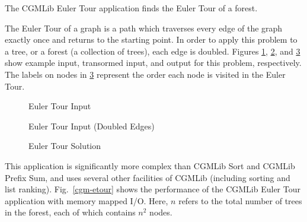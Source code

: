 \documentclass[12pt]{carletoncsthesis}
\begin{document}
The CGMLib Euler Tour application\cite{bsp-etour} finds the Euler Tour of a forest.

The Euler Tour of a graph is a path which traverses every edge of the
graph exactly once and returns to the starting point.  In order to apply
this problem to a tree, or a forest (a collection of trees), each edge is
doubled.  Figures \ref{euler-tree-start-fig}, \ref{euler-tree-doubled-fig},
and \ref{euler-tree-solved-fig} show example input, transormed input, and
output for this problem, respectively.  The labels on nodes in
\ref{euler-tree-solved-fig} represent the order each node is visited in the
Euler Tour.

\begin{figure}[h]
\begin{center}
\end{center}
\caption{Euler Tour Input}
\label{euler-tree-start-fig}
\end{figure}

\begin{figure}[h]
\begin{center}
\end{center}
\caption{Euler Tour Input (Doubled Edges)}
\label{euler-tree-doubled-fig}
\end{figure}

\begin{figure}[h]
\begin{center}
\end{center}
\caption{Euler Tour Solution}
\label{euler-tree-solved-fig}
\end{figure}

\clearpage

This application is significantly more complex than CGMLib Sort and CGMLib
Prefix Sum, and uses several other facilities of CGMLib (including sorting
and list ranking).  Fig.~\ref{cgm-etour} shows the performance of the CGMLib
Euler Tour application with memory mapped I/O.  Here, $n$ refers to the
total number of trees in the forest, each of which contains $n^2$ nodes.
\end{document}

